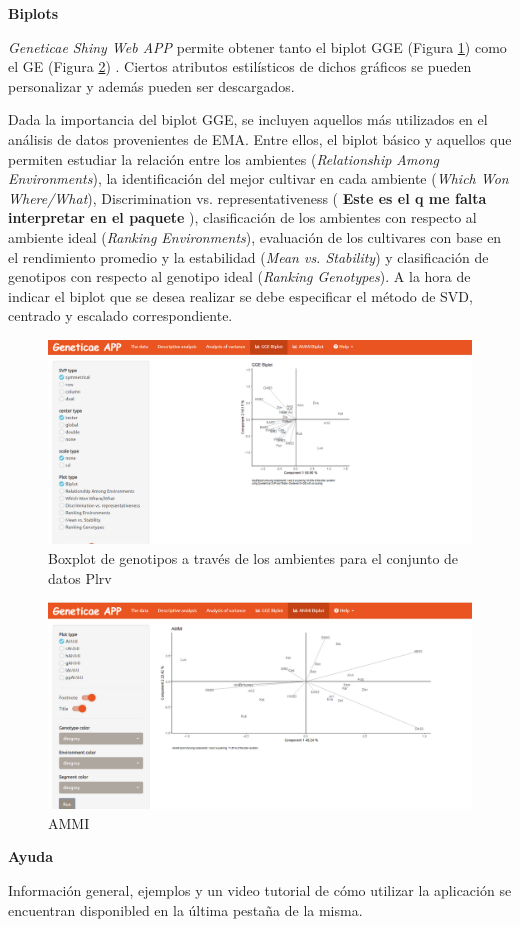 \textbf{Biplots}

\emph{Geneticae Shiny Web APP} permite obtener tanto el biplot GGE (Figura \ref{fig:fig4312}) como el GE (Figura \ref{fig:fig4313}) . Ciertos atributos estilísticos de dichos gráficos se pueden personalizar y además pueden ser descargados.

Dada la importancia del biplot GGE, se incluyen aquellos más utilizados en el análisis de datos provenientes de EMA. Entre ellos, el biplot básico y aquellos que permiten estudiar la relación entre los ambientes (\emph{Relationship Among Environments}), la identificación del mejor cultivar en cada ambiente (\emph{Which Won Where/What}), Discrimination vs. representativeness ( \textbf{Este es el q me falta interpretar en el paquete} ), clasificación de los ambientes con respecto al ambiente ideal (\emph{Ranking Environments}), evaluación de los cultivares con base en el rendimiento promedio y la estabilidad (\emph{Mean vs. Stability}) y  clasificación de genotipos con respecto al genotipo ideal (\emph{Ranking Genotypes}). A la hora de indicar el biplot que se desea realizar se debe especificar el método de SVD, centrado y escalado correspondiente.

\begin{figure}[H]
	\begin{center}
		\includegraphics[width=16cm]{./Graficos/GGE.png}
	\end{center}
	\caption{Boxplot de genotipos a través de los ambientes para el conjunto de datos Plrv}
	\label{fig:fig4312}
\end{figure}


\begin{figure}[H]
	\begin{center}
		\includegraphics[width=16cm]{./Graficos/AMMI_S.png}
	\end{center}
	\caption{AMMI}
	\label{fig:fig4313}
\end{figure}



\textbf{Ayuda}

Información general, ejemplos y un video tutorial de cómo utilizar la aplicación se encuentran disponibled en la última pestaña de la misma.
